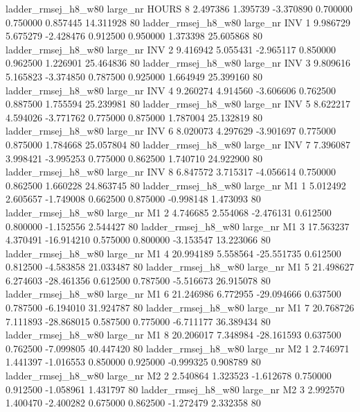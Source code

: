 ladder_rmsej_h8_w80   large_nr    HOURS                 8  2.497386  1.395739  -3.370890 0.700000 0.750000  0.857445   14.311928 80
ladder_rmsej_h8_w80   large_nr      INV                 1  9.986729  5.675279  -2.428476 0.912500 0.950000  1.373398   25.605868 80
ladder_rmsej_h8_w80   large_nr      INV                 2  9.416942  5.055431  -2.965117 0.850000 0.962500  1.226901   25.464836 80
ladder_rmsej_h8_w80   large_nr      INV                 3  9.809616  5.165823  -3.374850 0.787500 0.925000  1.664949   25.399160 80
ladder_rmsej_h8_w80   large_nr      INV                 4  9.260274  4.914560  -3.606606 0.762500 0.887500  1.755594   25.239981 80
ladder_rmsej_h8_w80   large_nr      INV                 5  8.622217  4.594026  -3.771762 0.775000 0.875000  1.787004   25.132819 80
ladder_rmsej_h8_w80   large_nr      INV                 6  8.020073  4.297629  -3.901697 0.775000 0.875000  1.784668   25.057804 80
ladder_rmsej_h8_w80   large_nr      INV                 7  7.396087  3.998421  -3.995253 0.775000 0.862500  1.740710   24.922900 80
ladder_rmsej_h8_w80   large_nr      INV                 8  6.847572  3.715317  -4.056614 0.750000 0.862500  1.660228   24.863745 80
ladder_rmsej_h8_w80   large_nr       M1                 1  5.012492  2.605657  -1.749008 0.662500 0.875000 -0.998148    1.473093 80
ladder_rmsej_h8_w80   large_nr       M1                 2  4.746685  2.554068  -2.476131 0.612500 0.800000 -1.152556    2.544427 80
ladder_rmsej_h8_w80   large_nr       M1                 3 17.563237  4.370491 -16.914210 0.575000 0.800000 -3.153547   13.223066 80
ladder_rmsej_h8_w80   large_nr       M1                 4 20.994189  5.558564 -25.551735 0.612500 0.812500 -4.583858   21.033487 80
ladder_rmsej_h8_w80   large_nr       M1                 5 21.498627  6.274603 -28.461356 0.612500 0.787500 -5.516673   26.915078 80
ladder_rmsej_h8_w80   large_nr       M1                 6 21.246986  6.772955 -29.094666 0.637500 0.787500 -6.194010   31.924787 80
ladder_rmsej_h8_w80   large_nr       M1                 7 20.768726  7.111893 -28.868015 0.587500 0.775000 -6.711177   36.389434 80
ladder_rmsej_h8_w80   large_nr       M1                 8 20.206017  7.348984 -28.161593 0.637500 0.762500 -7.099805   40.447420 80
ladder_rmsej_h8_w80   large_nr       M2                 1  2.746971  1.441397  -1.016553 0.850000 0.925000 -0.999325    0.908789 80
ladder_rmsej_h8_w80   large_nr       M2                 2  2.540864  1.323523  -1.612678 0.750000 0.912500 -1.058961    1.431797 80
ladder_rmsej_h8_w80   large_nr       M2                 3  2.992570  1.400470  -2.400282 0.675000 0.862500 -1.272479    2.332358 80
